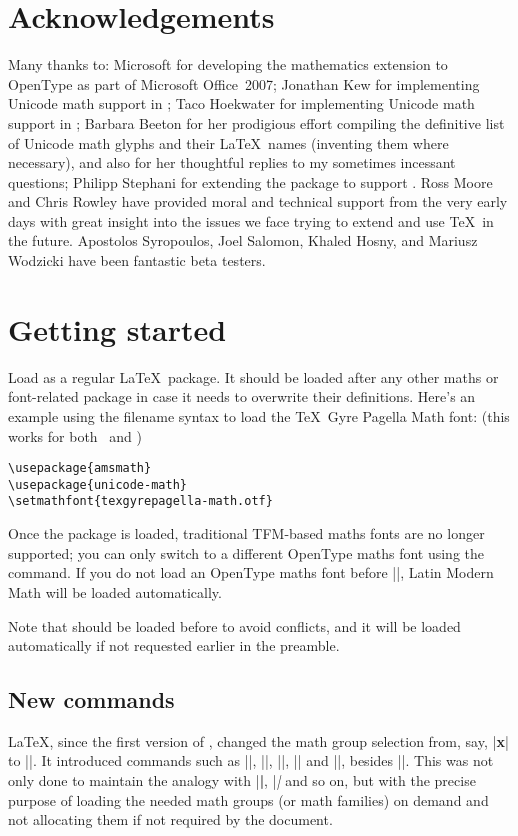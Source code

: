 \section{Acknowledgements}

Many thanks to:
Microsoft for developing the mathematics extension to OpenType as part of
Microsoft Office~2007;
Jonathan Kew for implementing Unicode math support in \XeTeX;
Taco Hoekwater for implementing Unicode math support in \LuaTeX;
Barbara Beeton for her prodigious effort compiling the definitive list of Unicode math
glyphs and their \LaTeX\ names (inventing them where necessary), and also
for her thoughtful replies to my sometimes incessant questions;
Philipp Stephani for extending the package to support \LuaTeX.
Ross Moore and Chris Rowley have provided moral and technical support
from the very early days with great insight into the issues we face trying
to extend and use \TeX\ in the future.
Apostolos Syropoulos, Joel Salomon, Khaled Hosny, and Mariusz Wodzicki
have been fantastic beta testers.

\section{Getting started}

Load  as a regular \LaTeX\ package. It should be loaded
after any other maths or font-related package in case it needs to overwrite
their definitions. Here's an example using the filename syntax to load the \TeX\ Gyre Pagella Math font: (this works for both \XeLaTeX\ and \LuaLaTeX)
\begin{Verbatim}
\usepackage{amsmath}
\usepackage{unicode-math}
\setmathfont{texgyrepagella-math.otf}
\end{Verbatim}

Once the package is loaded, traditional TFM-based maths fonts are no longer supported;
you can only switch to a different OpenType maths font using the  command.
If you do not load an OpenType maths font before ||, Latin Modern Math will be loaded automatically.

Note that  should be loaded before  to avoid conflicts, and
it will be loaded automatically if not requested earlier in the preamble.


\subsection{New commands}
\LaTeX, since the first version of \LaTeXe, changed the math group
selection from, say, |{\bf x}| to ||. It introduced commands
such as |\mathbf|, |\mathit|, |\mathsf|, |\mathtt| and |\mathcal|,
besides |\mathnormal|.  This was not only done to maintain the analogy
with |\textbf|, |\textit| and so on, but with the precise purpose of
loading the needed math groups (or math families) on demand and not
allocating them if not required by the document.

